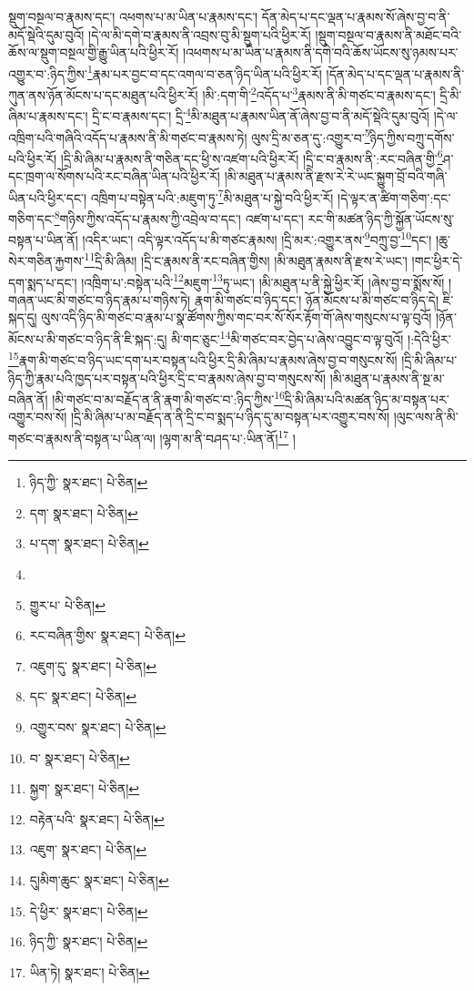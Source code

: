 སྡུག་བསྔལ་བ་རྣམས་དང་། འཕགས་པ་མ་ཡིན་པ་རྣམས་དང་། དོན་མེད་པ་དང་ལྡན་པ་རྣམས་སོ་ཞེས་བྱ་བ་ནི་མདོ་སྡེའི་དུམ་བུའོ། །དེ་ལ་མི་དགེ་བ་རྣམས་ནི་འབྲས་བུ་མི་སྡུག་པའི་ཕྱིར་རོ། །སྡུག་བསྔལ་བ་རྣམས་ནི་མཐོང་བའི་ཆོས་ལ་སྡུག་བསྔལ་གྱི་རྒྱུ་ཡིན་པའི་ཕྱིར་རོ། །འཕགས་པ་མ་ཡིན་པ་རྣམས་ནི་དགེ་བའི་ཆོས་ཡོངས་སུ་ཉམས་པར་འགྱུར་བ་:ཉིད་ཀྱིས་\footnote{ཉིད་ཀྱི་  སྣར་ཐང་།  པེ་ཅིན། }རྣམ་པར་བྱང་བ་དང་འགལ་བ་ཅན་ཉིད་ཡིན་པའི་ཕྱིར་རོ། །དོན་མེད་པ་དང་ལྡན་པ་རྣམས་ནི་ཀུན་ནས་ཉོན་མོངས་པ་དང་མཐུན་པའི་ཕྱིར་རོ། །མི་:དག་གི་\footnote{དག་  སྣར་ཐང་།  པེ་ཅིན། }འདོད་པ་\footnote{པ་དག་  སྣར་ཐང་།  པེ་ཅིན། }རྣམས་ནི་མི་གཙང་བ་རྣམས་དང་། དྲི་མི་ཞིམ་པ་རྣམས་དང་། དྲི་ང་བ་རྣམས་དང་། དྲི་\footnote{}མི་མཐུན་པ་རྣམས་ཡིན་ནོ་ཞེས་བྱ་བ་ནི་མདོ་སྡེའི་དུམ་བུའོ། །དེ་ལ་འཁྲིག་པའི་གཞིའི་འདོད་པ་རྣམས་ནི་མི་གཙང་བ་རྣམས་ཏེ། ལུས་དྲི་མ་ཅན་དུ་:འགྱུར་བ་\footnote{གྱུར་པ་  པེ་ཅིན། }ཉིད་ཀྱིས་བཀྲུ་དགོས་པའི་ཕྱིར་རོ། །དྲི་མི་ཞིམ་པ་རྣམས་ནི་གཅིན་དང་ཕྱི་ས་འཛག་པའི་ཕྱིར་རོ། །དྲི་ང་བ་རྣམས་ནི་:རང་བཞིན་གྱི་\footnote{རང་བཞིན་གྱིས་  སྣར་ཐང་།  པེ་ཅིན། }ཤ་དང་ཁྲག་ལ་སོགས་པའི་རང་བཞིན་ཡིན་པའི་ཕྱིར་རོ། །མི་མཐུན་པ་རྣམས་ནི་རྫས་རེ་རེ་ཡང་སྐྱུག་བྲོ་བའི་གཞི་ཡིན་པའི་ཕྱིར་དང་། འཁྲིག་པ་བསྟེན་པའི་:མཇུག་ཏུ་\footnote{འཇུག་དུ་  སྣར་ཐང་།  པེ་ཅིན། }མི་མཐུན་པ་སྐྱེ་བའི་ཕྱིར་རོ། །དེ་ལྟར་ན་ཚིག་གཅིག་:དང་གཅིག་དང་\footnote{དང་  སྣར་ཐང་།  པེ་ཅིན། }གཉིས་ཀྱིས་འདོད་པ་རྣམས་ཀྱི་འབྲེལ་བ་དང་། འཛག་པ་དང་། རང་གི་མཚན་ཉིད་ཀྱི་སྐྱོན་ཡོངས་སུ་བསྟན་པ་ཡིན་ནོ། །འདིར་ཡང་། འདི་ལྟར་འདོད་པ་མི་གཙང་རྣམས། །དྲི་མར་:འགྱུར་ནས་\footnote{འགྱུར་བས་  སྣར་ཐང་།  པེ་ཅིན། }བཀྲུ་བྱ་\footnote{བ་  སྣར་ཐང་།  པེ་ཅིན། }དང་། །ཆུ་སེར་གཅིན་རྐྱགས་\footnote{སྐྱག་  སྣར་ཐང་།  པེ་ཅིན། }དྲི་མི་ཞིམ། །དྲི་ང་རྣམས་ནི་རང་བཞིན་གྱིས། །མི་མཐུན་རྣམས་ནི་རྫས་རེ་ཡང་། །གང་ཕྱིར་དེ་དག་སྨད་པ་དང་། །འཁྲིག་པ་:བསྟེན་པའི་\footnote{བརྟེན་པའི་  སྣར་ཐང་།  པེ་ཅིན། }མཇུག་\footnote{འཇུག་  སྣར་ཐང་།  པེ་ཅིན། }ཏུ་ཡང་། །མི་མཐུན་པ་ནི་སྐྱེ་ཕྱིར་རོ། །ཞེས་བྱ་བ་སྨོས་སོ། །གཞན་ཡང་མི་གཙང་བ་ཉིད་རྣམ་པ་གཉིས་ཏེ། རྣག་མི་གཙང་བ་ཉིད་དང་། ཉོན་མོངས་པ་མི་གཙང་བ་ཉིད་དེ། ཇི་སྐད་དུ། ལུས་འདི་ཉིད་མི་གཙང་བ་རྣམ་པ་སྣ་ཚོགས་ཀྱིས་གང་བར་སོ་སོར་རྟོག་གོ་ཞེས་གསུངས་པ་ལྟ་བུའོ། །ཉོན་མོངས་པ་མི་གཙང་བ་ཉིད་ནི་ཇི་སྐད་:དུ། མི་གང་ཅུང་\footnote{དུ།མིག་ཆུང་  སྣར་ཐང་།  པེ་ཅིན། }མི་གཙང་བར་བྱེད་པ་ཞེས་འབྱུང་བ་ལྟ་བུའོ། །:དེའི་ཕྱིར་\footnote{དེ་ཕྱིར་  སྣར་ཐང་།  པེ་ཅིན། }རྣག་མི་གཙང་བ་ཉིད་ཡང་དག་པར་བསྟན་པའི་ཕྱིར་དྲི་མི་ཞིམ་པ་རྣམས་ཞེས་བྱ་བ་གསུངས་སོ། །དྲི་མི་ཞིམ་པ་ཉིད་ཀྱི་རྣམ་པའི་ཁྱད་པར་བསྟན་པའི་ཕྱིར་དྲི་ང་བ་རྣམས་ཞེས་བྱ་བ་གསུངས་སོ། །མི་མཐུན་པ་རྣམས་ནི་སྔ་མ་བཞིན་ནོ། །མི་གཙང་བ་མ་བརྗོད་ན་ནི་རྣག་མི་གཙང་བ་:ཉིད་ཀྱིས་\footnote{ཉིད་ཀྱི་  སྣར་ཐང་།  པེ་ཅིན། }དྲི་མི་ཞིམ་པའི་མཚན་ཉིད་མ་བསྟན་པར་འགྱུར་བས་སོ། །དྲི་མི་ཞིམ་པ་མ་བརྗོད་ན་ནི་དྲི་ང་བ་སྨད་པ་ཉིད་དུ་མ་བསྟན་པར་འགྱུར་བས་སོ། །ལུང་ལས་ནི་མི་གཙང་བ་རྣམས་ནི་བསྟན་པ་ཡིན་ལ། །ལྷག་མ་ནི་བཤད་པ་:ཡིན་ནོ།\footnote{ཡིན་ཏེ།  སྣར་ཐང་།  པེ་ཅིན། } །
